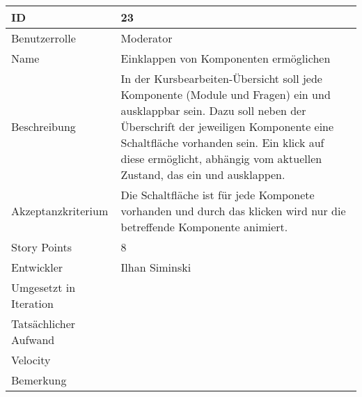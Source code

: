 \begin{tabularx}{\textwidth}{|p{}|X|}
	\hline
	ID & 23\\
	\hline
	Benutzerrolle & Moderator\\
	\hline
	Name & Einklappen von Komponenten ermöglichen\\
	\hline
	Beschreibung & In der Kursbearbeiten-Übersicht soll jede Komponente (Module und Fragen) ein und ausklappbar sein.
		Dazu soll neben der Überschrift der jeweiligen Komponente eine Schaltfläche vorhanden sein.
		Ein klick auf diese ermöglicht, abhängig vom aktuellen Zustand, das ein und ausklappen. \\
	\hline
	Akzeptanzkriterium & Die Schaltfläche ist für jede Komponete vorhanden und durch das klicken wird nur die betreffende Komponente animiert.\\
	\hline
	Story Points & 8 \\
	\hline
	Entwickler & Ilhan Siminski\\
	\hline
	Umgesetzt in Iteration & \\
	\hline
	Tatsächlicher Aufwand & \\
	\hline
	Velocity & \\
	\hline
	Bemerkung & \\
	\hline
\end{tabularx}
\vspace{20pt}
